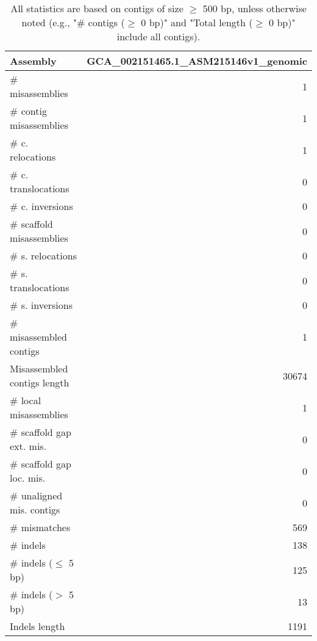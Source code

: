 \documentclass[12pt,a4paper]{article}
\begin{document}
\begin{table}[ht]
\begin{center}
\caption{All statistics are based on contigs of size $\geq$ 500 bp, unless otherwise noted (e.g., "\# contigs ($\geq$ 0 bp)" and "Total length ($\geq$ 0 bp)" include all contigs).}
\begin{tabular}{|l*{1}{|r}|}
\hline
Assembly & GCA\_002151465.1\_ASM215146v1\_genomic \\ \hline
\# misassemblies & 1 \\ \hline
\hspace{2mm}\# contig misassemblies & 1 \\ \hline
\hspace{5mm}\# c. relocations & 1 \\ \hline
\hspace{5mm}\# c. translocations & 0 \\ \hline
\hspace{5mm}\# c. inversions & 0 \\ \hline
\hspace{2mm}\# scaffold misassemblies & 0 \\ \hline
\hspace{5mm}\# s. relocations & 0 \\ \hline
\hspace{5mm}\# s. translocations & 0 \\ \hline
\hspace{5mm}\# s. inversions & 0 \\ \hline
\# misassembled contigs & 1 \\ \hline
Misassembled contigs length & 30674 \\ \hline
\# local misassemblies & 1 \\ \hline
\# scaffold gap ext. mis. & 0 \\ \hline
\# scaffold gap loc. mis. & 0 \\ \hline
\# unaligned mis. contigs & 0 \\ \hline
\# mismatches & 569 \\ \hline
\# indels & 138 \\ \hline
\hspace{5mm}\# indels ($\leq$ 5 bp) & 125 \\ \hline
\hspace{5mm}\# indels ($>$ 5 bp) & 13 \\ \hline
Indels length & 1191 \\ \hline
\end{tabular}
\end{center}
\end{table}
\end{document}
